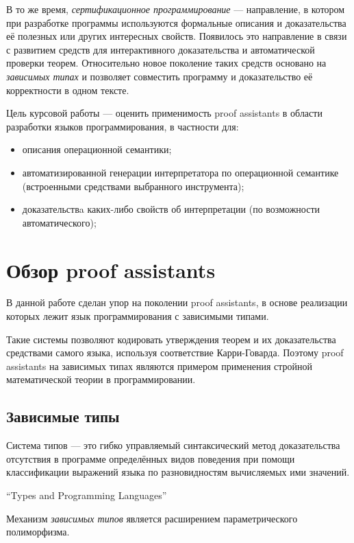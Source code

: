 \documentclass[aps,12pt,final,oneside,onecolumn,musixtex,superscriptaddress,centertags]{article}
\begin{document}
     В то же время, \emph{сертификационное программирование} --- направление, в котором при разработке программы используются формальные описания и доказательства её полезных или других интересных свойств. Появилось это направление в связи с развитием средств для интерактивного доказательства и автоматической проверки теорем. Относительно новое поколение таких средств основано на \emph{зависимых типах} и позволяет совместить программу и доказательство её корректности в одном тексте.

     Цель курсовой работы --- оценить применимость proof assistants в области разработки языков программирования, в частности для:
     \begin{itemize}
        \item описания операционной семантики;
        \item автоматизированной генерации интерпретатора по операционной семантике (встроенными средствами выбранного инструмента);
        \item доказательствa каких-либо свойств об интерпретации (по возможности автоматического);
     \end{itemize}

  \newpage
  \section{Обзор proof assistants}

     В данной работе сделан упор на поколении proof assistants, в основе реализации которых лежит язык программирования с зависимыми типами.

     Такие системы позволяют кодировать утверждения теорем и их доказательства средствами самого языка, используя соответствие Карри-Говарда. Поэтому proof assistants на зависимых типах являются примером применения стройной математической теории в программировании. 

  \subsection{Зависимые типы}

     \setlength{\epigraphwidth}{10cm}
     \epigraph{Система типов --- это гибко управляемый синтаксический метод доказательства отсутствия в программе определённых видов поведения при помощи классификации выражений языка по разновидностям вычисляемых ими значений.}{``Types and Programming Languages''\cite{Pierce:2002:TPL:509043}}

     Механизм \emph{зависимых типов} является расширением параметрического полиморфизма.
\end{document}
